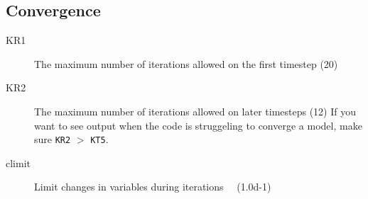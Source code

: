 \subsection{Convergence}
\label{sec:initdat:convergence}

\begin{description}
\item[KR1]\hypertarget{kr1}{} The maximum number of iterations allowed on the first timestep (20)
\item[KR2]\hypertarget{kr2}{} The maximum number of iterations allowed on later timesteps  (12)
  If you want to see output when the code is struggeling to converge a model, make sure \texttt{KR2} $>$
  \texttt{KT5}.
\item[climit]\hypertarget{climit}{} Limit changes in variables during iterations \ \  (1.0d-1)



\end{description}

